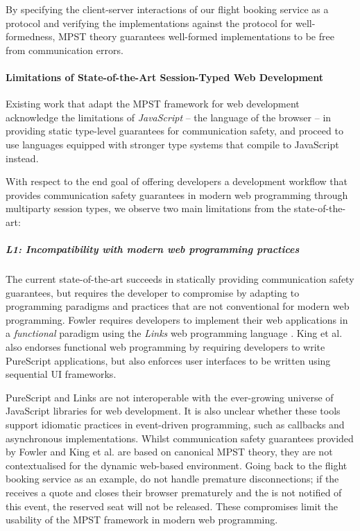 By specifying the client-server interactions of 
our flight booking service as a protocol 
and verifying the implementations against 
the protocol for well-formedness, 
MPST theory guarantees well-formed 
implementations to be free from communication errors.

\paragraph{Limitations of State-of-the-Art Session-Typed Web Development}
Existing work \cite{MVU2020,PureScript2019} that 
adapt the MPST framework for web development
acknowledge the limitations of \textit{JavaScript} 
-- the language of the browser --
in providing static type-level guarantees
for communication safety, 
and proceed to use
languages equipped with stronger type systems that 
compile to JavaScript instead.

With respect to the end goal of 
offering developers a development workflow
that provides communication safety guarantees in modern
web programming through multiparty session types,
we observe two main limitations from the state-of-the-art:

\subparagraph{L1: 
Incompatibility with modern web programming practices}

The current state-of-the-art succeeds in statically
providing communication safety guarantees,
but requires the developer to compromise by adapting
to programming paradigms and practices that are not
conventional for modern web programming.
Fowler \cite{MVU2020} requires developers
to implement their web applications in a \textit{functional} 
paradigm using the \textit{Links} 
web programming language \cite{LINKS}.
King et al. \cite{PureScript2019} also endorses
functional web programming by requiring developers to
write PureScript \cite{PureScript} applications, but also
enforces user interfaces to be written using 
sequential UI frameworks.

PureScript and Links are not interoperable
with the ever-growing universe of JavaScript libraries for
web development.
It is also unclear whether these tools support idiomatic
practices in event-driven programming, such as callbacks
and asynchronous implementations.
Whilst communication safety guarantees provided by
Fowler \cite{MVU2020} and King et al. \cite{PureScript2019}
are based on
canonical MPST theory, they are not contextualised
for the dynamic web-based environment.
Going back to the flight booking service as an example,
\cite{PureScript2019,MVU2020} do not handle premature
disconnections; if the  receives a quote
and closes their browser prematurely and the 
is not notified of this event, 
the reserved seat will not be released.
These compromises limit the usability of the MPST framework
in modern web programming.

